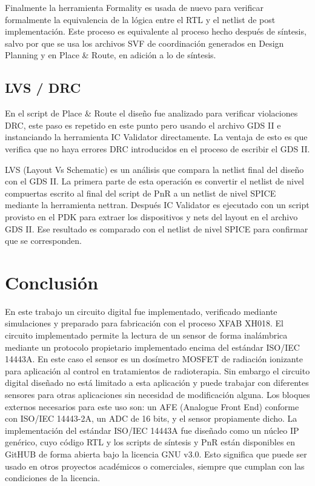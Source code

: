 \documentclass[a4paper, twoside, 11pt]{report}
\begin{document}
Finalmente la herramienta Formality es usada de nuevo para verificar formalmente la equivalencia de la lógica entre el RTL y el netlist de post implementación. Este proceso es equivalente al proceso hecho después de síntesis, salvo por que se usa los archivos SVF de coordinación generados en Design Planning y en Place \& Route, en adición a lo de síntesis.

\FloatBarrier
\section{LVS / DRC}

En el script de Place \& Route el diseño fue analizado para verificar violaciones DRC, este paso es repetido en este punto pero usando el archivo GDS II e instanciando la herramienta IC Validator directamente. La ventaja de esto es que verifica que no haya errores DRC introducidos en el proceso de escribir el GDS II.

LVS (Layout Vs Schematic) es un análisis que compara la netlist final del diseño con el GDS II. La primera parte de esta operación es convertir el netlist de nivel compuertas escrito al final del script de PnR a un netlist de nivel SPICE mediante la herramienta nettran. Después IC Validator es ejecutado con un script provisto en el PDK para extraer los dispositivos y nets del layout en el archivo GDS II. Ese resultado es comparado con el netlist de nivel SPICE para confirmar que se corresponden.


\FloatBarrier
\chapter{Conclusión}

En este trabajo un circuito digital fue implementado, verificado mediante simulaciones y preparado para fabricación con el proceso XFAB XH018. El circuito implementado permite la lectura de un sensor de forma inalámbrica mediante un protocolo propietario implementado encima del estándar ISO/IEC 14443A. En este caso el sensor es un dosímetro MOSFET de radiación ionizante para aplicación al control en tratamientos de radioterapia. Sin embargo el circuito digital diseñado no está limitado a esta aplicación y puede trabajar con diferentes sensores para otras aplicaciones sin necesidad de modificación alguna. Los bloques externos necesarios para este uso son: un AFE (Analogue Front End) conforme con ISO/IEC 14443-2A, un ADC de 16 bits, y el sensor propiamente dicho. La implementación del estándar ISO/IEC 14443A fue diseñado como un núcleo IP genérico, cuyo código RTL y los scripts de síntesis y PnR están disponibles en GitHUB de forma abierta bajo la licencia GNU v3.0. Esto significa que puede ser usado en otros proyectos académicos o comerciales, siempre que cumplan con las condiciones de la licencia.
\end{document}
